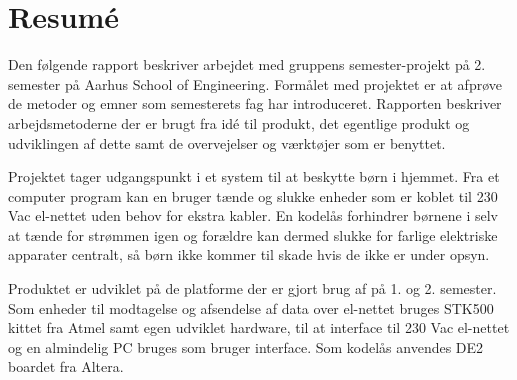\chapter*{Resumé}

Den følgende rapport beskriver arbejdet med gruppens semester-projekt på 2. semester på Aarhus School of Engineering. Formålet med projektet er at afprøve de metoder og emner som semesterets fag har introduceret. Rapporten beskriver arbejdsmetoderne der er brugt fra idé til produkt, det egentlige produkt og udviklingen af dette samt de overvejelser og værktøjer som er benyttet.

Projektet tager udgangspunkt i et system til at beskytte børn i hjemmet. Fra et computer program kan en bruger tænde og slukke enheder som er koblet til 230 Vac el-nettet uden behov for ekstra kabler. En kodelås forhindrer børnene i selv at tænde for strømmen igen og forældre kan dermed slukke for farlige elektriske apparater centralt, så børn ikke kommer til skade hvis de ikke er under opsyn. 

Produktet er udviklet på de platforme der er gjort brug af på 1. og 2. semester. Som enheder til modtagelse og afsendelse af data over el-nettet bruges STK500 kittet fra Atmel samt egen udviklet hardware, til at interface til 230 Vac el-nettet og en almindelig PC bruges som bruger interface. Som kodelås anvendes DE2 boardet fra Altera.

